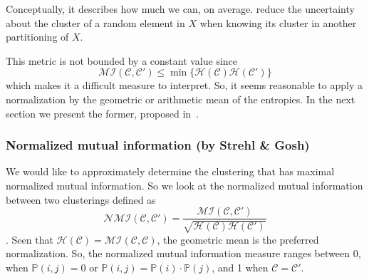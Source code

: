 Conceptually, it describes how much we can, on average. reduce the uncertainty about the cluster of a random element in $X$ when knowing its cluster in another partitioning of $X$.

This metric is not bounded by a constant value since
\begin{equation*}
    \mathcal{MI}(\mathcal{C},\mathcal{C}')\leq\min\{\mathcal{H}(\mathcal{C})\mathcal{H}(\mathcal{C}')\}
\end{equation*}
which makes it a difficult measure to interpret. So, it seems reasonable to apply a normalization by the geometric or arithmetic mean of the entropies. In the next section we present the former, proposed in~\cite{StrehlA2003Ce-A}.

\subsubsection{Normalized mutual information (by Strehl \& Gosh)}
We would like to approximately determine the clustering that has maximal normalized mutual information. So we look at the normalized mutual information between two clusterings defined as
\begin{equation*}
    \mathcal{NMI}(\mathcal{C},\mathcal{C}') = \frac{\mathcal{MI}(\mathcal{C},\mathcal{C}')}{\sqrt{\mathcal{H}(\mathcal{C}) \mathcal{H}(\mathcal{C}')}}
\end{equation*}.
Seen that $\mathcal{H}(\mathcal{C})=\mathcal{MI}(\mathcal{C},\mathcal{C})$, the geometric mean is the preferred normalization. So, the normalized mutual information measure ranges between 0, when $\mathbb{P}(i,j)=0$ or $\mathbb{P}(i,j)=\mathbb{P}(i)\cdot\mathbb{P}(j)$, and 1 when $\mathcal{C}=\mathcal{C}'$.

